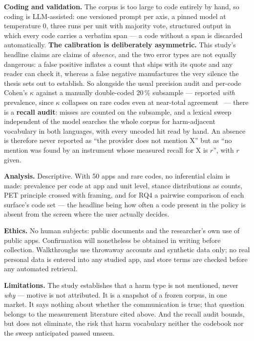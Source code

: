 \documentclass[10pt,a4paper]{article}
\begin{document}
\textbf{Coding and validation.} The corpus is too large to code entirely by
hand, so coding is LLM-assisted: one versioned prompt per axis, a pinned model
at temperature 0, three runs per unit with majority vote, structured output in
which every code carries a verbatim span --- a code without a span is discarded
automatically. \textbf{The calibration is deliberately asymmetric.} This study's
headline claims are claims of \emph{absence}, and the two error types are not
equally dangerous: a false positive inflates a count that ships with its quote
and any reader can check it, whereas a false negative manufactures the very
silence the thesis sets out to establish. So alongside the usual precision audit
and per-code Cohen's $\kappa$ against a manually double-coded 20\,\% subsample
--- reported \emph{with} prevalence, since $\kappa$ collapses on rare codes even
at near-total agreement~\parencite{cohen1960coefficient} --- there is a
\textbf{recall audit}: misses are counted on the subsample, and a lexical sweep
independent of the model searches the whole corpus for harm-adjacent vocabulary
in both languages, with every uncoded hit read by hand. An absence is therefore
never reported as \enquote{the provider does not mention X} but as
\enquote{no mention was found by an instrument whose measured recall for X is
$r$}, with $r$ given.

\textbf{Analysis.} Descriptive. With 50 apps and rare codes, no inferential
claim is made: prevalence per code at app and unit level, stance distributions
as counts, PET principle crossed with framing, and for RQ4 a pairwise comparison
of each surface's code set --- the headline being how often a code present in
the policy is absent from the screen where the user actually decides.

\textbf{Ethics.} No human subjects: public documents and the researcher's own
use of public apps. Confirmation will nonetheless be obtained in writing before
collection. Walkthroughs use throwaway accounts and synthetic data only; no real
personal data is entered into any studied app, and store terms are checked
before any automated retrieval.

\textbf{Limitations.} The study establishes that a harm type is not mentioned,
never \emph{why} --- motive is not attributed. It is a snapshot of a frozen
corpus, in one market. It says nothing about whether the communication is true;
that question belongs to the measurement literature cited above. And the
recall audit bounds, but does not eliminate, the risk that harm vocabulary
neither the codebook nor the sweep anticipated passed unseen.
\end{document}
